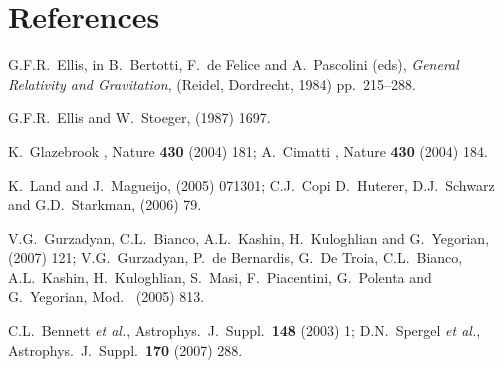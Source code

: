 \documentclass[12pt]{iopart}
\begin{document}
\section*{References}
\begin{thebibliography}{66}

G.F.R.~Ellis,
in B.~Bertotti, F.~de Felice and A.~Pascolini (eds), {\it General
Relativity and Gravitation}, (Reidel, Dordrecht, 1984) pp.~215--288.

G.F.R.~Ellis and W.~Stoeger,
 (1987) 1697.

K.~Glazebrook \etal,
Nature {\bf430} (2004) 181;
A.~Cimatti \etal,
Nature {\bf430} (2004) 184.

K.~Land and J.~Magueijo,
 (2005) 071301; %
C.J.~Copi D.~Huterer, D.J.~Schwarz and G.D.~Starkman,
 (2006) 79. %

V.G.~Gurzadyan, C.L.~Bianco, A.L.~Kashin, H.~Kuloghlian and G.~Yegorian,
 (2007) 121;\br %
V.G.~Gurzadyan, P.~de Bernardis, G.~De Troia, C.L.~Bianco, A.L.~Kashin,
H.~Kuloghlian, S.~Masi, F.~Piacentini, G.~Polenta and G.~Yegorian,
Mod.\  (2005) 813. %

C.L.~Bennett {\it et al.},
Astrophys.\ J.\ Suppl.\ {\bf148} (2003) 1; %
D.N.~Spergel {\it et al.},
Astrophys.\ J.\ Suppl.\ {\bf170} (2007) 288.%


\end{thebibliography}
\end{document}
